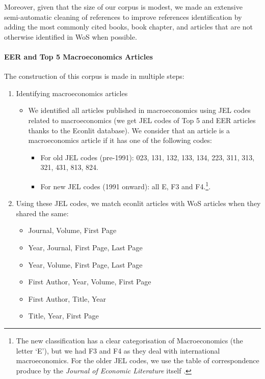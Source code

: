 \documentclass[]{elsarticle} %
\providecommand{\tightlist}{%
  \setlength{\itemsep}{0pt}\setlength{\parskip}{0pt}}
\begin{document}
Moreover, given that the size of our corpus is modest, we made an
extensive semi-automatic cleaning of references to improve references
identification by adding the most commonly cited books, book chapter,
and articles that are not otherwise identified in WoS when possible.

\hypertarget{eer-top5-macro}{%
\paragraph*{EER and Top 5 Macroeconomics
Articles}\label{eer-top5-macro}}

The construction of this corpus is made in multiple steps:

\begin{enumerate}
\def\labelenumi{\arabic{enumi}.}
\item
  Identifying macroeconomics articles

  \begin{itemize}
  \item
    We identified all articles published in macroeconomics using JEL
    codes related to macroeconomics (we get JEL codes of Top 5 and EER
    articles thanks to the Econlit database). We consider that an
    article is a macroeconomics article if it has one of the following
    codes:

    \begin{itemize}
    \tightlist
    \item
      For old JEL codes (pre-1991): 023, 131, 132, 133, 134, 223, 311,
      313, 321, 431, 813, 824.
    \item
      For new JEL codes (1991 onward): all E, F3 and F4.\footnote{The
        new classification has a clear categorisation of Macroeconomics
        (the letter `E'), but we had F3 and F4 as they deal with
        international macroeconomics. For the older JEL codes, we use
        the table of correspondence produce by the \emph{Journal of
        Economic Literature} itself \citep{jel1991}.}.
    \end{itemize}
  \end{itemize}
\item
  Using these JEL codes, we match econlit articles with WoS articles
  when they shared the same:

  \begin{itemize}
  \tightlist
  \item
    Journal, Volume, First Page
  \item
    Year, Journal, First Page, Last Page
  \item
    Year, Volume, First Page, Last Page
  \item
    First Author, Year, Volume, First Page
  \item
    First Author, Title, Year
  \item
    Title, Year, First Page
  \end{itemize}
\end{enumerate}
\end{document}
